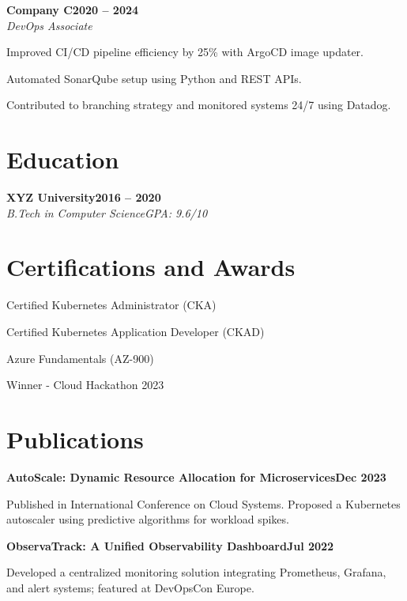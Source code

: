 \documentclass[letterpaper,10pt]{article}
\newcommand{\heading}[2]{
  \hspace{10pt}#1\hfill#2\\
}
\newcommand{\headingBf}[2]{
  \heading{\textbf{#1}}{\textbf{#2}}
}
\newcommand{\headingIt}[2]{
  \heading{\textit{#1}}{\textit{#2}}
}
\newenvironment{resume_list}{
  \vspace{-7pt}
  \begin{itemize}[itemsep=-2px, parsep=1pt, leftmargin=30pt]
}{
  \end{itemize}
}
\begin{document}
\headingBf{Company C}{2020 -- 2024}
\headingIt{DevOps Associate}{}
\begin{resume_list}
  \item Improved CI/CD pipeline efficiency by 25\% with ArgoCD image updater.
  \item Automated SonarQube setup using Python and REST APIs.
  \item Contributed to branching strategy and monitored systems 24/7 using Datadog.
\end{resume_list}

\section{Education}
\headingBf{XYZ University}{2016 -- 2020}
\headingIt{B.Tech in Computer Science}{GPA: 9.6/10}

\section{Certifications and Awards}
\begin{resume_list}
  \item Certified Kubernetes Administrator (CKA)
  \item Certified Kubernetes Application Developer (CKAD)
  \item Azure Fundamentals (AZ-900)
  \item Winner - Cloud Hackathon 2023
\end{resume_list}


\section{Publications}
\headingBf{AutoScale: Dynamic Resource Allocation for Microservices}{Dec 2023}
\begin{resume_list}
  \item Published in International Conference on Cloud Systems. Proposed a Kubernetes autoscaler using predictive algorithms for workload spikes.
\end{resume_list}

\headingBf{ObservaTrack: A Unified Observability Dashboard}{Jul 2022}
\begin{resume_list}
  \item Developed a centralized monitoring solution integrating Prometheus, Grafana, and alert systems; featured at DevOpsCon Europe.
\end{resume_list}
\end{document}
